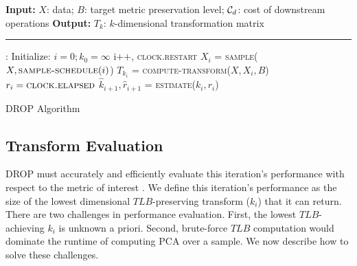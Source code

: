 
\begin{algorithm}[t!]
\begin{algorithmic}[1]
\small
\Statex \textbf{Input:}  $X$: data; $B$: target metric preservation level; $\mathcal{C}_{\color{black}d}$: cost of downstream operations
\Statex \textbf{Output:} $T_k$: $k$-dimensional transformation matrix
\Statex
\Statex \hrule
{}:
	\State Initialize: $i = 0; k_0 = \infty$ 
	\Do
		\State i$\texttt{++}$, \textsc{clock.restart}
		\State $X_i$ = \textsc{sample}($X, \textsc{sample-schedule}(i)$) \label{eq:sample}
			\Comment{\S~\ref{subsec:psample}}
		\State $T_{k_i}$ = \textsc{compute-transform}($X, X_i,  B$) \label{eq:evaluate}
			\Comment{\S~\ref{subsec:teval}}
		\State $r_i = \textsc{clock.elapsed}$	
		\State $\hat{k}_{i+1}, \hat{r}_{i+1} $ = \textsc{estimate}($k_i, r_i$) \label{eq:estimate}
			\Comment{\S~\ref{subsec:pest}}
	 \label{eq:optimize}
		\Comment{\S~\ref{subsec:opt}}
	\\
\EndFunction
\end{algorithmic}
\caption{DROP Algorithm}
\label{alg:DROP}
\end{algorithm}



\subsection{Transform Evaluation}
\label{subsec:teval}
DROP must accurately and efficiently evaluate this iteration's performance with respect to the metric of interest . 
We define this iteration's performance as the size of the lowest dimensional $TLB$-preserving transform ($k_i$) that it can return. 
There are two challenges in performance evaluation.
First, the lowest $TLB$-achieving $k_i$ is unknown a priori. 
Second, brute-force $TLB$ computation would dominate the runtime of computing PCA over a sample. 
We now describe how to solve these challenges.

